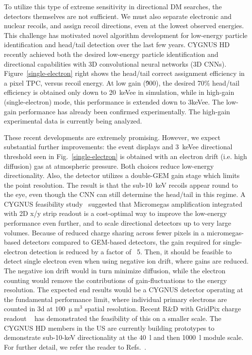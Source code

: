 To utilize this type of extreme sensitivity in directional DM searches, the detectors themselves are not sufficient. We must also separate electronic and nuclear recoils, and assign recoil directions, even at the lowest observed energies. This challenge has motivated novel algorithm development for low-energy particle identification and head/tail detection over the last few years. CYGNUS HD recently achieved both the desired low-energy particle identification and directional capabilities with 3D convolutional neural networks (3D CNNs). Figure~\ref{single-electron} right shows the head/tail correct assignment efficiency in a pixel TPC, versus recoil energy. At low gain (\~900), the desired 70\% head/tail efficiency is obtained only down to 20~keVee in simulation, while in high-gain (single-electron) mode, this performance is extended down to 3keVee. The low-gain performance has already been confirmed experimentally. The high-gain experimental data is currently being analyzed.

These recent developments are extremely promising. However, we expect substantial further improvements: the event displays and 3~keVee directional threshold seen in Fig.~\ref{single-electron} is obtained with an electron drift (i.e. high diffusion) gas at atmospheric pressure. Both choices reduce low-energy directionality. Also, the detector utilizes a double-GEM gain stage which limits the point resolution. The result is that the sub-10~keV recoils appear round to the eye, even though the CNN can still determine the head/tail in this regime. A CYGNUS feasibility study~\cite{Vahsen:2020pzb} suggested that Micromegas amplification integrated with 2D x/y strip readout is a cost-optimal way to improve the low-energy performance even further, and to scale directional detectors up to very large volumes. Because of reduced charge sharing across fewer pixels in a micromegas-based detectors compared to GEM-based detectors, the gain required for single-electron detection is reduced by a factor of ~5. Then, it should be feasible to detect single electron even when using negative ion drift, where gains are reduced. The negative ion drift would in turn minimize diffusion, while the electron counting would remove the contributions of gain-fluctuations to the energy resolution. The expected end results would be a CYGNUS detector operating at the fundamental performance limit, where individual primary electrons are counted in 3d at $100~\upmu$m$^3$ spatial resolution. Recent R\&D with GridPix charge readout ~\cite{Ligtenberg:2021viw} has demonstrated the feasibility of this on a smaller scale. The CYGNUS HD members in the US are currently building prototypes to demonstrate sub-10-keV directionality at the 40~l and then 1000~l module scale. For further detail, we refer the reader to Refs.~\cite{Vahsen:2021gnb,Vahsen:2020pzb}. 



